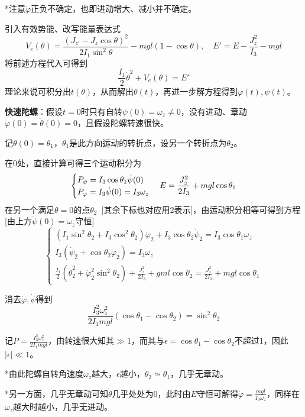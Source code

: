 \documentclass[a4paper,UTF8,fontset=windows]{ctexart}
\begin{document}
*注意$\dot{\varphi}$正负不确定，也即进动增大、减小并不确定。

引入有效势能、改写能量表达式
$$V_e(\theta)=\frac{(J_{z'}-J_z\cos\theta)^2}{2I_1\sin^2\theta}-mgl(1-\cos\theta),\quad E'=E-\frac{J_z^2}{I_3}-mgl$$
将前述方程代入可得到
$$\frac{I_1}{2}\dot{\theta}^2+V_e(\theta)=E'$$
理论来说可积分出$t(\theta)$，从而解出$\theta(t)$，再进一步解方程得到$\varphi(t),\psi(t)$。

\textbf{快速陀螺}：假设$t=0$时只有自转$\psi(0)=\omega_z\ne0$，没有进动、章动$\dot{\varphi}(0)=\dot{\theta}(0)=0$，且假设陀螺转速很快。

记$\theta(0)=\theta_1$，$\theta_1$是此方向运动的转折点，设另一个转折点为$\theta_2$。

在0处，直接计算可得三个运动积分为
$$\begin{cases}P_\psi=I_3\cos\theta_1\dot{\psi}(0)\\P_\varphi=I_3\dot{\psi}(0)=I_3\omega_z\end{cases}\\E=\frac{J_z^2}{2I_3}+mgl\cos\theta_1$$
在另一个满足$\dot{\theta}=0$的点$\theta_2$\ [其余下标也对应用2表示]，由运动积分相等可得到方程[由上方$\dot{\psi}(0)=\omega_z$守恒]
$$\begin{cases}(I_1\sin^2\theta_2+I_3\cos^2\theta_2)\dot{\varphi}_2+I_3\cos\theta_2\dot{\psi}_2=I_3\cos\theta_1\omega_z\\I_3(\dot{\psi}_2+\cos\theta_2\dot{\varphi}_2)=I_3\omega_z\\\frac{I_1}{2}(\dot{\theta}_2^2+\dot{\varphi}_2^2\sin^2\theta_2)+\frac{J_z^2}{2I_3}+gml\cos\theta_2=\frac{J_z^2}{2I_3}+mgl\cos\theta_1\end{cases}$$

消去$\dot{\varphi},\dot{\psi}$得到
$$\frac{I_3^2\omega_z^2}{2I_1mgl}(\cos\theta_1-\cos\theta_2)=\sin^2\theta_2$$

记$P=\frac{I_3^2\omega_z^2}{2I_1mgl}$，由转速很大知其$\gg1$，而其与$\epsilon=\cos\theta_1-\cos\theta_2$不超过1，因此$|\epsilon|\ll1$。

*由此陀螺自转角速度$\omega_z$越大，$\epsilon$越小，$\theta_2\simeq\theta_1$，几乎无章动。

*另一方面，几乎无章动可知$\dot{\theta}$几乎处处为0，此时由$E$守恒可解得$\dot{\varphi}=\frac{mgl}{I_3\omega_z}$，同样在$\omega_z$越大时越小，几乎无进动。
\end{document}
